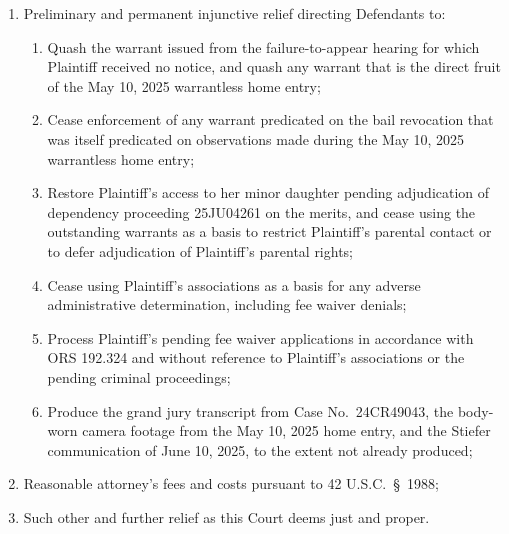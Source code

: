 \documentclass[12pt,letterpaper]{article}
\newcommand{\sect}{§}
\begin{document}
\begin{enumerate}[label=\Alph*.,leftmargin=0.5in,itemsep=4pt]
		\item Preliminary and permanent injunctive relief directing
		Defendants to:
		\begin{enumerate}[label=(\roman*),leftmargin=0.5in,
			itemsep=2pt]
			\item Quash the warrant issued from the failure-to-appear
			hearing for which Plaintiff received no notice, and quash
			any warrant that is the direct fruit of the May 10, 2025
			warrantless home entry;
			\item Cease enforcement of any warrant predicated on the
			bail revocation that was itself predicated on observations
			made during the May 10, 2025 warrantless home entry;
			\item Restore Plaintiff's access to her minor daughter
			pending adjudication of dependency proceeding 25JU04261
			on the merits, and cease using the outstanding warrants as
			a basis to restrict Plaintiff's parental contact or to
			defer adjudication of Plaintiff's parental rights;
			\item Cease using Plaintiff's associations as a basis for
			any adverse administrative determination, including fee
			waiver denials;
			\item Process Plaintiff's pending fee waiver applications
			in accordance with ORS 192.324 and without reference to
			Plaintiff's associations or the pending criminal
			proceedings;
			\item Produce the grand jury transcript from Case
			No.\ 24CR49043, the body-worn camera footage from the
			May 10, 2025 home entry, and the Stiefer communication of
			June 10, 2025, to the extent not already produced;
		\end{enumerate}
		
		\item Reasonable attorney's fees and costs pursuant to
		42 U.S.C.\ \sect\ 1988;
		
		\item Such other and further relief as this Court deems just
		and proper.
		
	\end{enumerate}
\end{document}
